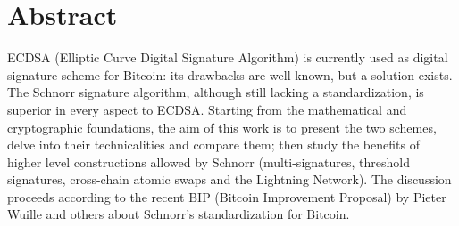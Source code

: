 \chapter{Abstract}
\label{chpr:abstract}
ECDSA (Elliptic Curve Digital Signature Algorithm) is currently used as digital signature scheme for Bitcoin: its drawbacks are well known, but a solution exists. The Schnorr signature algorithm, although still lacking a standardization, is superior in every aspect to ECDSA. Starting from the mathematical and cryptographic foundations, the aim of this work is to present the two schemes, delve into their technicalities and compare them; then study the benefits of higher level constructions allowed by Schnorr (multi-signatures, threshold signatures, cross-chain atomic swaps and the Lightning Network). The discussion proceeds according to the recent BIP (Bitcoin Improvement Proposal) by Pieter Wuille and others about Schnorr's standardization for Bitcoin.
